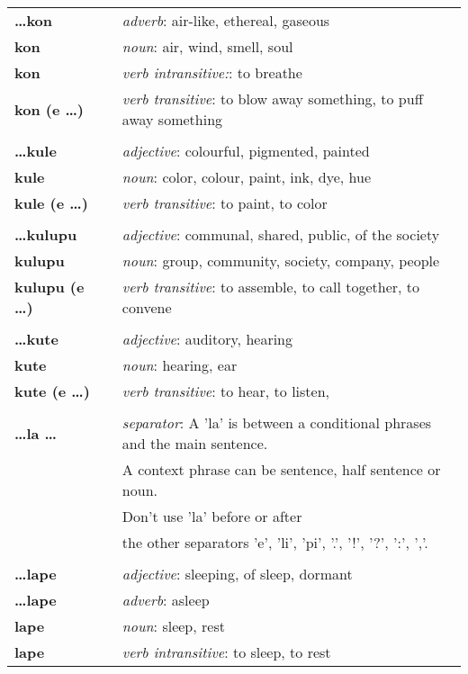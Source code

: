 \begin{supertabular}{p{2,5cm}|ll}
\textbf{\dots kon} && \textit{adverb}: air-like, ethereal, gaseous \\ 
\textbf{kon} && \textit{noun}: air, wind, smell, soul \\ 
\textbf{kon} && \textit{verb intransitive:}: to breathe \\ 
\textbf{kon (e \dots)} && \textit{verb transitive}: to blow away something, to puff away something \\ 
 && \\ %
\textbf{\dots kule} && \textit{adjective}: colourful, pigmented, painted \\ 
\textbf{kule} && \textit{noun}: color, colour, paint, ink, dye, hue \\ 
\textbf{kule (e \dots)} && \textit{verb transitive}: to paint, to color \\ 
 && \\ %
\textbf{\dots kulupu} && \textit{adjective}: communal, shared, public, of the society \\ 
\textbf{kulupu} && \textit{noun}: group, community, society, company, people \\ 
\textbf{kulupu (e \dots)} && \textit{verb transitive}: to assemble, to call together, to convene \\ 
 && \\ %
\textbf{\dots kute} && \textit{adjective}: auditory, hearing \\ 
\textbf{kute} && \textit{noun}: hearing, ear \\ 
\textbf{kute (e \dots)} && \textit{verb transitive}: to hear, to listen, \\ 
 && \\ %
\textbf{\dots la \dots} && \textit{separator}:  A 'la' is between a conditional phrases and the main sentence. \\ && A context phrase can be sentence, half sentence or noun. \\ && Don't use 'la' before or after \\ && the other separators 'e', 'li', 'pi', '.', '!', '?', ':', ','.  \\ 
 && \\ %
\textbf{\dots lape} && \textit{adjective}: sleeping, of sleep, dormant \\ 
\textbf{\dots lape} && \textit{adverb}: asleep \\ 
\textbf{lape} && \textit{noun}: sleep, rest \\ 
\textbf{lape} && \textit{verb intransitive}: to sleep, to rest \\ 

\end{supertabular}
